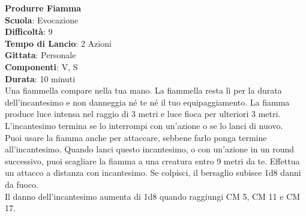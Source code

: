 \begin{multicols}{2}
\medskip\textbf{Produrre Fiamma}\\
\textbf{Scuola}: Evocazione\\
\textbf{Difficoltà}: 9\\
\textbf{Tempo di Lancio}: 2 Azioni\\
\textbf{Gittata}: Personale\\
\textbf{Componenti}: V, S\\
\textbf{Durata}: 10 minuti\\
Una fiammella compare nella tua mano. La fiammella resta lì per la durata dell'incantesimo e non danneggia né te né il tuo equipaggiamento. La fiamma produce luce intensa nel raggio di 3 metri e luce fioca per ulteriori 3 metri. L'incantesimo termina se lo interrompi con un'azione o se lo lanci di nuovo.\\
Puoi usare la fiamma anche per attaccare, sebbene farlo ponga termine all'incantesimo. Quando lanci questo incantesimo, o con un'azione in un round successivo, puoi scagliare la fiamma a una creatura entro 9 metri da te. Effettua un attacco a distanza con incantesimo. Se colpisci, il bersaglio subisce 1d8 danni da fuoco.\\
Il danno dell'incantesimo aumenta di 1d8 quando raggiungi CM 5, CM 11 e CM 17.


\end{multicols}
